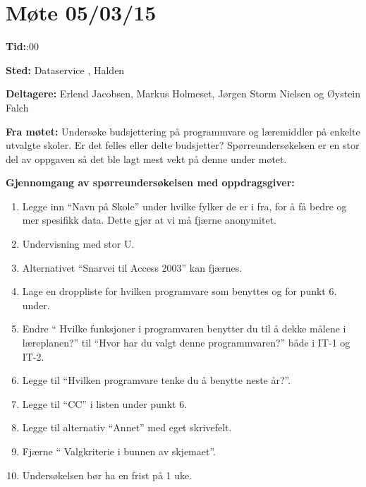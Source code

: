 \newpage



\section{Møte 05/03/15}


\vspace{30pt}
\textbf{Tid:}:00\newline 

\hspace{-17pt}\textbf{Sted:}\newline 
Dataservice , Halden
\newline

\hspace{-17pt}\textbf{Deltagere:}\newline 
Erlend Jacobsen, Markus Holmeset,\newline
Jørgen Storm Nielsen og Øystein Falch
\newline

\hspace{-17pt}\textbf{Fra møtet:}\newline
Undersøke budsjettering på programmvare og læremiddler på enkelte utvalgte skoler.
Er det felles eller delte budsjetter?\newline
Spørreundersøkelsen er en stor del av oppgaven så det ble lagt mest vekt på denne under møtet.\newline


\textbf{Gjennomgang av spørreundersøkelsen med oppdragsgiver:}
\begin{enumerate}
\item Legge inn “Navn på Skole” under hvilke fylker de er i fra, for å få bedre og mer spesifikk data. Dette gjør at vi må fjærne anonymitet.
\item Undervisning med stor U. 
\item Alternativet “Snarvei til Access 2003” kan fjærnes.
\item Lage en droppliste for hvilken programvare som benyttes og for punkt 6. under.
\item Endre “ Hvilke funksjoner i programvaren benytter du til å dekke målene i læreplanen?” til “Hvor har du valgt denne programmvaren?” både i IT-1 og IT-2.
\item Legge til “Hvilken programvare tenke du å benytte neste år?”.
\item Legge til “CC” i listen under punkt 6.
\item Legge til alternativ “Annet” med eget skrivefelt.
\item Fjærne “ Valgkriterie i bunnen av skjemaet”.
\item Undersøkelsen bør ha en frist på 1 uke.
\end{enumerate}

